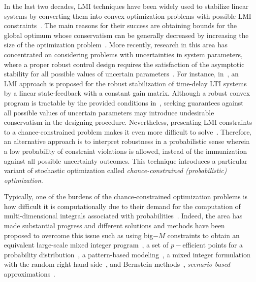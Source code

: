 \documentclass[journal]{IEEEtran}
\begin{document}
In the last two decades, LMI techniques have been widely used to stabilize linear systems by converting them into convex optimization problems with possible LMI constraints~\cite{Boyd1994linear,Ben2002tractable, Skelton1997unified}. The main reasons for their success are obtaining bounds for the global optimum whose conservatism can be generally decreased by increasing the size of the optimization problem~\cite{Gahinet1996explicit, Skelton1997unified,Chesi2010lmi}. More recently, research in this area has concentrated on considering problems with uncertainties in system parameters, where a proper robust control design requires the satisfaction of the asymptotic stability for all possible values of uncertain parameters~\cite{Apkarian2000parameterized}. For instance, in~\cite{Li1997criteria}, an LMI approach is proposed for the robust stabilization of time-delay LTI systems by a linear state-feedback with a constant gain matrix. Although a robust convex program is tractable by the provided conditions in~\cite{Ben1998robust, El1998robust, Bertsimas2006tractable, Bertsimas2004price}, seeking guarantees against all possible values of uncertain parameters may introduce undesirable conservatism in the designing procedure. Nevertheless, presenting LMI constraints to a chance-constrained problem makes it even more difficult to solve~\cite{Vajda2014probabilistic}. Therefore, an alternative approach is to interpret robustness in a probabilistic sense wherein a low probability of constraint violations is allowed, instead of the immunization against all possible uncertainty outcomes. This technique introduces a particular variant of stochastic optimization called \textit{chance-constrained (probabilistic) optimization}.

Typically, one of the burdens of the chance-constrained optimization problems is how difficult it is computationally due to their demand for the computation of multi-dimensional integrals associated with probabilities~\cite{Shapiro2009lectures,Boyd2004convex}. Indeed, the area has made substantial progress and different solutions and methods have been proposed to overcome this issue such as using big$- M $ constraints to obtain an equivalent large-scale mixed integer program~\cite{Tanner2010iis,Xu2015stochastic}, a set of $ p- $efficient points for a probability distribution~\cite{Dentcheva2000concavity,Prekopa1990dual}, a pattern-based modeling~\cite{Lejeune2012pattern,Lejeune2012pattern}, a mixed integer formulation with the random right-hand side~\cite{Luedtke2010integer,Kuccukyavuz2012mixing}, and Bernstein methods~\cite{Nemirovski2006convex}, \textit{scenario-based} approximations~\cite{Calafiore2005uncertain, Campi2008exact, Campi2011sampling}.
\end{document}
